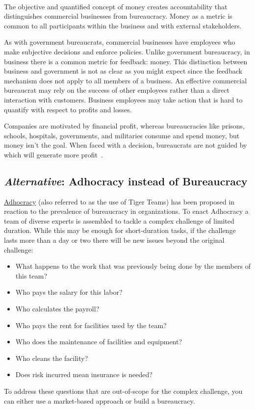 \ \\

The objective and quantified concept of money creates accountability that distinguishes commercial businesses from bureaucracy. Money as a metric is common to all participants within the business and with external stakeholders. 

As with government bureaucrats, commercial businesses have employees who make subjective decisions and enforce policies. Unlike government bureaucracy, in business there is a common metric for feedback: money. This distinction between business and government is not as clear as you might expect since the feedback mechanism does not apply to all members of a business. An effective commercial bureaucrat may rely on the success of other employees rather than a direct interaction with customers. Business employees may take action that is hard to quantify with respect to profits and losses.

Companies are motivated by financial profit, whereas bureaucracies like prisons, schools, hospitals, governments, and militaries  consume and spend money, but money isn't the goal. When faced with a decision, bureaucrats are not guided by which will generate more profit~\cite{2012_Wilson}.

\subsection*{\textit{Alternative}: Adhocracy instead of Bureaucracy}

\href{https://en.wikipedia.org/wiki/Adhocracy}{Adhocracy} 
\iftoggle{WPinmargin}{\marginpar{$>$Wikipedia: Adhocracy}}{} 
(also referred to as the use of Tiger Teams)
has been proposed in reaction to the prevalence of bureaucracy in organizations. To enact Adhocracy a team of diverse experts is assembled to tackle a complex challenge of limited duration.
While this may be enough for short-duration tasks, if the challenge lasts more than a day or two there will be new issues beyond the original challenge:

\begin{itemize}
    \item What happens to the work that was previously being done by the members of this team?
    \item Who pays the salary for this labor?
    \item Who calculates the payroll?
    \item Who pays the rent for facilities used by the team?
    \item Who does the maintenance of facilities and equipment?
    \item Who cleans the facility?
    \item Does risk incurred mean insurance is needed?
\end{itemize}
To address these questions that are out-of-scope for the complex challenge, you can either use a market-based approach or build a bureaucracy. 

